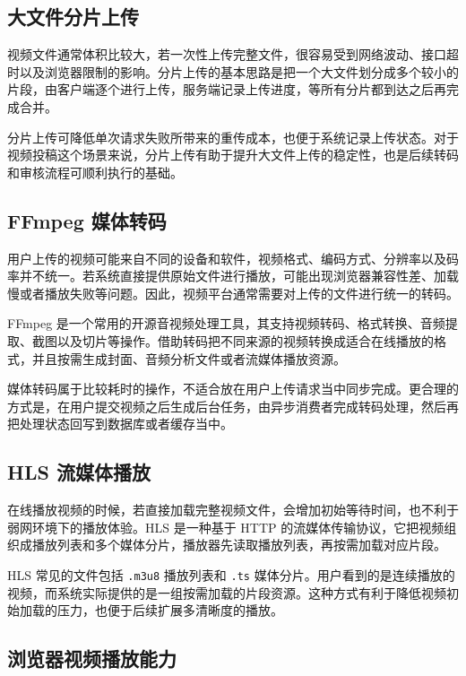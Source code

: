 \subsection{大文件分片上传}
\label{subsec:chunk-upload}

视频文件通常体积比较大，若一次性上传完整文件，很容易受到网络波动、接口超时以及浏览器限制的影响。分片上传的基本思路是把一个大文件划分成多个较小的片段，由客户端逐个进行上传，服务端记录上传进度，等所有分片都到达之后再完成合并。

分片上传可降低单次请求失败所带来的重传成本，也便于系统记录上传状态。对于视频投稿这个场景来说，分片上传有助于提升大文件上传的稳定性，也是后续转码和审核流程可顺利执行的基础。

\subsection{FFmpeg 媒体转码}
\label{subsec:ffmpeg-transcode}

用户上传的视频可能来自不同的设备和软件，视频格式、编码方式、分辨率以及码率并不统一。若系统直接提供原始文件进行播放，可能出现浏览器兼容性差、加载慢或者播放失败等问题。因此，视频平台通常需要对上传的文件进行统一的转码。

FFmpeg 是一个常用的开源音视频处理工具，其支持视频转码、格式转换、音频提取、截图以及切片等操作\cite{ffmpegdocs}。借助转码把不同来源的视频转换成适合在线播放的格式，并且按需生成封面、音频分析文件或者流媒体播放资源。

媒体转码属于比较耗时的操作，不适合放在用户上传请求当中同步完成。更合理的方式是，在用户提交视频之后生成后台任务，由异步消费者完成转码处理，然后再把处理状态回写到数据库或者缓存当中。

\subsection{HLS 流媒体播放}
\label{subsec:hls-streaming}

在线播放视频的时候，若直接加载完整视频文件，会增加初始等待时间，也不利于弱网环境下的播放体验。HLS 是一种基于 HTTP 的流媒体传输协议，它把视频组织成播放列表和多个媒体分片，播放器先读取播放列表，再按需加载对应片段\cite{rfc8216hls}。

HLS 常见的文件包括 \texttt{.m3u8} 播放列表和 \texttt{.ts} 媒体分片。用户看到的是连续播放的视频，而系统实际提供的是一组按需加载的片段资源。这种方式有利于降低视频初始加载的压力，也便于后续扩展多清晰度的播放。

\subsection{浏览器视频播放能力}
\label{subsec:html5-video}

